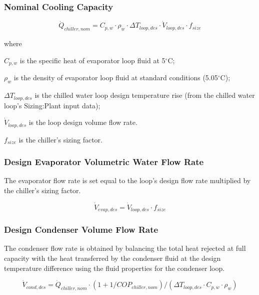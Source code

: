 \subsubsection{Nominal Cooling Capacity}\label{nominal-cooling-capacity}

\begin{equation}
\dot Q_{chiller,nom} = C_{p,w} \cdot \rho_w \cdot \Delta T_{loop,des} \cdot \dot V_{loop,des} \cdot f_{size}
\end{equation}

where

\( C_{p,w} \) is the specific heat of evaporator loop fluid at 5\(^{\circ}\)C;

\( \rho_w \) is the density of evaporator loop fluid at standard conditions (5.05\(^{\circ}\)C);

\( \Delta T_{loop,des} \) is the chilled water loop design temperature rise (from the chilled water loop's Sizing:Plant input data);

\( \dot V_{loop,des} \) is the loop design volume flow rate.

\( f_{size} \) is the chiller's sizing factor.

\subsubsection{Design Evaporator Volumetric Water Flow Rate}\label{design-evaporator-volumetric-water-flow-rate}

The evaporator flow rate is set equal to the loop's design flow rate multiplied by the chiller's sizing factor.

\begin{equation}
\dot V_{evap,des} = \dot V_{loop,des} \cdot f_{size}
\end{equation}

\subsubsection{Design Condenser Volume Flow Rate}\label{design-condenser-volume-flow-rate}

The condenser flow rate is obtained by balancing the total heat rejected at full capacity with the heat transferred by the condenser fluid at the design temperature difference using the fluid properties for the condenser loop.

\begin{equation}
\dot V_{cond,des} = \dot Q_{chiller,nom} \cdot (1 + 1/COP_{chiller,nom})/(\Delta T_{loop,des} \cdot C_{p,w} \cdot \rho_w)
\end{equation}

